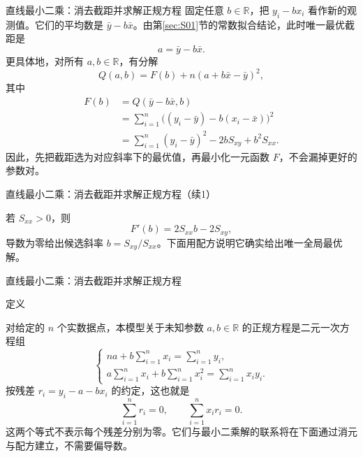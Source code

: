 \documentclass[aspectratio=169,10pt,fontset=fandol]{ctexbeamer}
\begin{document}
\begin{frame}[t,fragile]{直线最小二乘：消去截距并求解正规方程}
\footnotesize
{\footnotesize
固定任意 $b\in\mathbb{R}$，把 $y_i-bx_i$ 看作新的观测值。它们的平均数是 $\bar{y}-b\bar{x}$。由第\ref{sec:S01}节的常数拟合结论，此时唯一最优截距是
\[
a=\bar{y}-b\bar{x}.
\]
更具体地，对所有 $a,b\in\mathbb{R}$，有分解
\[
Q(a,b)=F(b)+n(a+b\bar{x}-\bar{y})^2,
\]
其中
\[
\begin{aligned}
F(b)&=Q(\bar{y}-b\bar{x},b)\\
&=\sum_{i=1}^{n}\bigl((y_i-\bar{y})-b(x_i-\bar{x})\bigr)^2\\
&=\sum_{i=1}^{n}(y_i-\bar{y})^2-2bS_{xy}+b^2S_{xx}.
\end{aligned}
\]
因此，先把截距选为对应斜率下的最优值，再最小化一元函数 $F$，不会漏掉更好的参数对。
}
\end{frame}
\begin{frame}[t,fragile]{直线最小二乘：消去截距并求解正规方程（续1）}
\footnotesize
{\footnotesize
若 $S_{xx}>0$，则
\[
F'(b)=2S_{xx}b-2S_{xy},
\]
导数为零给出候选斜率 $b=S_{xy}/S_{xx}$。下面用配方说明它确实给出唯一全局最优解。\par

}
\end{frame}
\begin{frame}[t,fragile]{直线最小二乘：消去截距并求解正规方程}
\footnotesize
\begin{block}{定义}
{\footnotesize
对给定的 $n$ 个实数据点，本模型关于未知参数 $a,b\in\mathbb{R}$ 的正规方程是二元一次方程组
\[
\begin{cases}
na+b\displaystyle\sum_{i=1}^{n}x_i=\displaystyle\sum_{i=1}^{n}y_i,\\
a\displaystyle\sum_{i=1}^{n}x_i+b\displaystyle\sum_{i=1}^{n}x_i^2=\displaystyle\sum_{i=1}^{n}x_i y_i.
\end{cases}
\]
按残差 $r_i=y_i-a-bx_i$ 的约定，这也就是
\[
\sum_{i=1}^{n}r_i=0,\qquad \sum_{i=1}^{n}x_i r_i=0.
\]
这两个等式不表示每个残差分别为零。它们与最小二乘解的联系将在下面通过消元与配方建立，不需要偏导数。

}
\end{block}
\end{frame}
\end{document}
